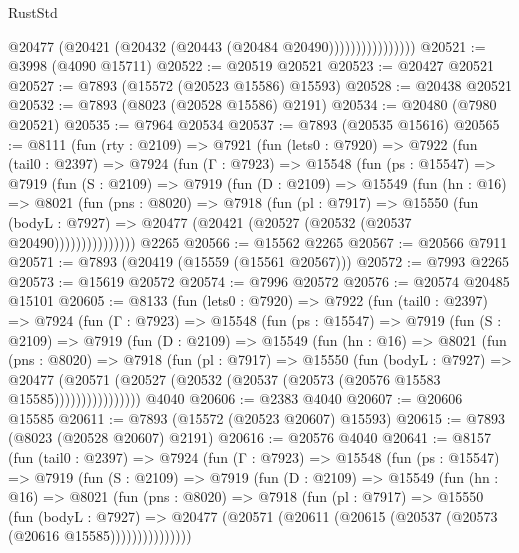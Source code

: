 \begin{lexlean}{RustStd}
\begin{coremodule}
                          @20477 (@20421 (@20432 (@20443 (@20484 @20490))))))))))))))))
@20521 := @3998 (@4090 @15711)
@20522 := @20519 @20521
@20523 := @20427 @20521
@20527 := @7893 (@15572 (@20523 @15586) @15593)
@20528 := @20438 @20521
@20532 := @7893 (@8023 (@20528 @15586) @2191)
@20534 := @20480 (@7980 @20521)
@20535 := @7964 @20534
@20537 := @7893 (@20535 @15616)
@20565 := @8111
    (fun (rty : @2109) =>
    @7921
      (fun (lets0 : @7920) =>
      @7922
        (fun (tail0 : @2397) =>
        @7924
          (fun (Γ : @7923) =>
          @15548
            (fun (ps : @15547) =>
            @7919
              (fun (S : @2109) =>
              @7919
                (fun (D : @2109) =>
                @15549
                  (fun (hn : @16) =>
                  @8021
                    (fun (pns : @8020) =>
                    @7918
                      (fun (pl : @7917) =>
                      @15550
                        (fun (bodyL : @7927) =>
                        @20477 (@20421 (@20527 (@20532 (@20537 @20490)))))))))))))))
    @2265
@20566 := @15562 @2265
@20567 := @20566 @7911
@20571 := @7893 (@20419 (@15559 (@15561 @20567)))
@20572 := @7993 @2265
@20573 := @15619 @20572
@20574 := @7996 @20572
@20576 := @20574 @20485 @15101
@20605 := @8133
    (fun (lets0 : @7920) =>
    @7922
      (fun (tail0 : @2397) =>
      @7924
        (fun (Γ : @7923) =>
        @15548
          (fun (ps : @15547) =>
          @7919
            (fun (S : @2109) =>
            @7919
              (fun (D : @2109) =>
              @15549
                (fun (hn : @16) =>
                @8021
                  (fun (pns : @8020) =>
                  @7918
                    (fun (pl : @7917) =>
                    @15550
                      (fun (bodyL : @7927) =>
                      @20477
                        (@20571
                          (@20527 (@20532 (@20537 (@20573 (@20576 @15583 @15585))))))))))))))))
    @4040
@20606 := @2383 @4040
@20607 := @20606 @15585
@20611 := @7893 (@15572 (@20523 @20607) @15593)
@20615 := @7893 (@8023 (@20528 @20607) @2191)
@20616 := @20576 @4040
@20641 := @8157
    (fun (tail0 : @2397) =>
    @7924
      (fun (Γ : @7923) =>
      @15548
        (fun (ps : @15547) =>
        @7919
          (fun (S : @2109) =>
          @7919
            (fun (D : @2109) =>
            @15549
              (fun (hn : @16) =>
              @8021
                (fun (pns : @8020) =>
                @7918
                  (fun (pl : @7917) =>
                  @15550
                    (fun (bodyL : @7927) =>
                    @20477 (@20571 (@20611 (@20615 (@20537 (@20573 (@20616 @15585)))))))))))))))

\end{coremodule}
\end{lexlean}
